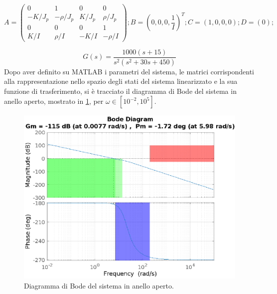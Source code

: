 \documentclass[a4paper]{article}
\begin{document}
\begin{equation}
    \label{eqn:linearization}
A = \begin{pmatrix}0 & 1 & 0 & 0 \\
    -K/J_p & -\rho/J_p & K/J_p & \rho/J_p \\
    0    &   0    &   0    &   1\\
    K/I  & \rho/I & -K/I &-\rho/I
\end{pmatrix};
B = (0, 0, 0, \frac{1}{I})^T;
C = (1, 0, 0, 0);
D = (0);
\end{equation}



\begin{equation}
    \label{eqn:G}
    G(s) = \frac{1000 (s+15)}{s^2 (s^2 + 30s + 450)}
\end{equation}
Dopo aver definito su MATLAB i parametri del sistema, le matrici corrispondenti alla rappresentazione nello spazio degli stati del sistema linearizzato e la sua funzione di trasferimento, si è tracciato il diagramma di Bode del sistema in anello aperto, mostrato in \cref{fig:bode_G}, per $\omega \in [10^{-2}, 10^5]$.

\begin{figure}[h!]
    \centering
    \includegraphics[width=\textwidth]{bode_G}
    \caption{Diagramma di Bode del sistema in anello aperto.}
    \label{fig:bode_G}
\end{figure}
\end{document}
